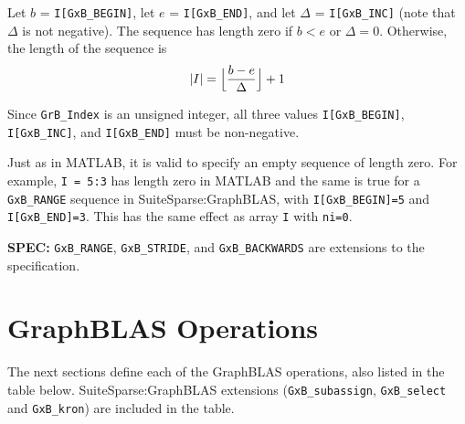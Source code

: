 \documentclass[12pt]{article}
\begin{document}
\begin{enumerate}
    \vspace{-0.1in}
    Let $b$ = \verb'I[GxB_BEGIN]', let $e$ = \verb'I[GxB_END]', and let
    $\Delta$ = \verb'I[GxB_INC]' (note that $\Delta$ is not negative).  The
    sequence has length zero if $b < e$ or $\Delta=0$.  Otherwise, the length
    of the sequence is
    \[
    |I| = \Bigl\lfloor\dfrac{b-e}{\Delta}\Bigr\rfloor + 1
    \]

\end{enumerate}

Since \verb'GrB_Index' is an unsigned integer, all three values
\verb'I[GxB_BEGIN]', \verb'I[GxB_INC]', and \verb'I[GxB_END]' must
be non-negative.

Just as in MATLAB, it is valid to specify an empty sequence of length zero.
For example, \verb'I = 5:3' has length zero in MATLAB and the same is
true for a \verb'GxB_RANGE' sequence in SuiteSparse:GraphBLAS, with
\verb'I[GxB_BEGIN]=5' and \verb'I[GxB_END]=3'.  This has the same
effect as array \verb'I' with \verb'ni=0'.

\begin{spec}
{\bf SPEC:} \verb'GxB_RANGE', \verb'GxB_STRIDE', and \verb'GxB_BACKWARDS'
are extensions to the specification.
\end{spec}

\newpage
\section{GraphBLAS Operations} %
\label{operations}

The next sections define each of the GraphBLAS operations, also listed in the
table below.  SuiteSparse:GraphBLAS extensions (\verb'GxB_subassign',
\verb'GxB_select' and \verb'GxB_kron') are included in the table.
\end{document}
